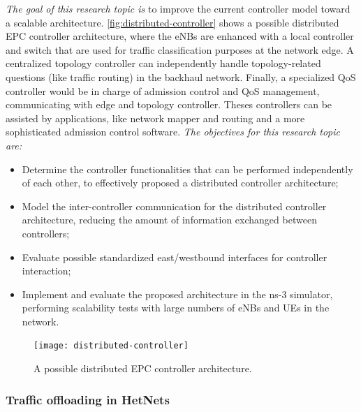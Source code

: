 \emph{The goal of this research topic is} to improve the current controller
model toward a scalable architecture. \autoref{fig:distributed-controller}
shows a possible distributed \ac{EPC} controller architecture, where the
\acp{eNB} are enhanced with a local controller and switch that are used for
traffic classification purposes at the network edge. A centralized topology
controller can independently handle topology-related questions (like traffic
routing) in the backhaul network. Finally, a specialized \ac{QoS} controller
would be in charge of admission control and \ac{QoS} management, communicating
with edge and topology controller. Theses controllers can be assisted by
applications, like network mapper and routing and a more sophisticated
admission control software. 
\emph{The objectives for this research topic are:}
\begin{itemize}
  \item Determine the controller functionalities that can be performed
  independently of each other, to effectively proposed a distributed controller
  architecture;

  \item Model the inter-controller communication for the distributed controller
  architecture, reducing the amount of information exchanged between
  controllers;

  \item Evaluate possible standardized east/westbound interfaces for controller
  interaction;

  \item Implement and evaluate the proposed architecture in the \ac{ns-3}
  simulator, performing scalability tests with large numbers of \acp{eNB} and
  \acp{UE} in the network.
\end{itemize}

\begin{figure}[htb]
  \centering
  \texttt{[image: distributed-controller]}
  \caption{A possible distributed \acs{EPC} controller architecture.}
  \label{fig:distributed-controller}
\end{figure}

\subsubsection{Traffic offloading in \acsp{HetNet}}
\label{subsec:heterogeneous}

